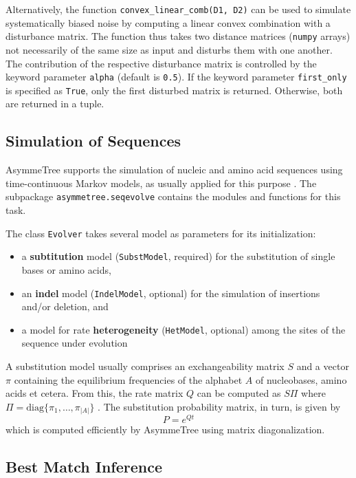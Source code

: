 \documentclass[hidelinks,11pt]{article}
\begin{document}
Alternatively, the function \texttt{convex\_linear\_comb(D1, D2)} can be used to simulate systematically biased noise by computing a linear convex combination with a disturbance matrix.
The function thus takes two distance matrices (\texttt{numpy} arrays) not necessarily of the same size as input and disturbs them with one another.
The contribution of the respective disturbance matrix is controlled by the keyword parameter \texttt{alpha} (default is \texttt{0.5}).
If the keyword parameter \texttt{first\_only} is specified as \texttt{True}, only the first disturbed matrix is returned.
Otherwise, both are returned in a tuple.


\subsection{Simulation of Sequences}

AsymmeTree supports the simulation of nucleic and amino acid sequences using time-continuous Markov models, as usually applied for this purpose \citep[for textbooks, see e.g.][]{felsenstein2004,yang2006,yang2014}.
The subpackage \texttt{asymmetree.seqevolve} contains the modules and functions for this task.

The class \texttt{Evolver} takes several model as parameters for its initialization:
\begin{itemize}
	\item a \textbf{subtitution} model (\texttt{SubstModel}, required) for the substitution of single bases or amino acids,
	\item an \textbf{indel} model (\texttt{IndelModel}, optional) for the simulation of insertions and/or deletion, and
	\item a model for rate \textbf{heterogeneity} (\texttt{HetModel}, optional) among the sites of the sequence under evolution 
\end{itemize}

A substitution model usually comprises an exchangeability matrix $S$ and a vector $\pi$ containing the equilibrium frequencies of the alphabet $A$ of nucleobases, amino acids et cetera.
From this, the rate matrix $Q$ can be computed as $S\Pi$ where $\Pi=\textrm{diag}\{\pi_1,\dots,\pi_{|A|}\}$ \citep{yang2006}.
The substitution probability matrix, in turn, is given by \[P=e^{Qt}\] which is computed efficiently by AsymmeTree using matrix diagonalization.



\subsection{Best Match Inference}
\end{document}
